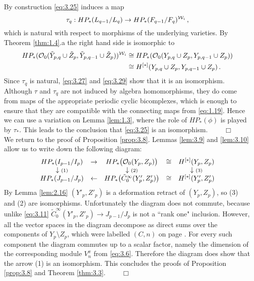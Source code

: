 By construction \eqref{eq:3.25} induces a map
\[
\tau_q : HP_* (L_{q-1}/L_q ) \to HP_* (F_{q-1}/F_q )^{\mathcal W_i} \,,
\]
which is natural with respect to morphisms of the underlying varieties.
By Theorem \ref{thm:1.4}.a the right hand side is isomorphic to
\begin{equation}\label{eq:3.29}
\begin{split} HP_* (\mathcal O_0 (\tilde Y_{p,q} \cup \tilde Z_p 
,\tilde Y_{p,q-1} \cup \tilde Z_p ) )^{\mathcal W_i} 
& \cong HP_* (\mathcal O_0 (Y_{p,q} \cup Z_p ,Y_{p,q-1} \cup Z_p )) \\
& \cong H^{[*]} (Y_{p,q} \cup Z_p ,Y_{p,q-1} \cup Z_p ) \,.
\end{split}
\end{equation}
Since $\tau_q$ is natural, \eqref{eq:3.27} and \eqref{eq:3.29} show that it is an isomorphism.
Although $\tau$ and $\tau_q$ are not induced by algebra homomorphisms, they do come from maps of
the appropriate periodic cyclic bicomplexes, which is enough to ensure that they are compatible
with the connecting maps from \eqref{eq:1.19}. Hence we can use a variation on Lemma \ref{lem:1.3}, 
where the role of $HP_* (\phi )$ is played by $\tau_*$.
This leads to the conclusion that \eqref{eq:3.25} is an isomorphism. $\qquad \Box$
\\[2mm]

We return to the proof of Proposition \ref{prop:3.8}.
Lemmas \ref{lem:3.9} and \ref{lem:3.10} allow us to write down the following diagram:
\[
\begin{array}{ccccc}
HP_* (I_{p-1}/I_p ) & \rightarrow & HP_* \big( \mathcal O_0 (Y_p ,Z_p ) \big) 
& \cong & H^{[*]} (Y_p , Z_p ) \\
\downarrow {\scriptstyle(1)} & & \downarrow {\scriptstyle(2)} & & \downarrow {\scriptstyle(3)} \\
HP_* (J_{p-1}/J_p ) & \leftarrow & HP_* \big( \tilde C_0^\infty (Y'_p , Z'_p ) \big) 
& \cong &H^{[*]} (Y'_p ,Z'_p ) 
\end{array}
\]
By Lemma \ref{lem:2.16} $(Y'_p ,Z'_p )$ is a deformation retract of $(Y_p ,Z_p )$, so (3) and (2)
are isomorphisms. Unfortunately the diagram does not commute, because unlike \eqref{eq:3.11} 
$\tilde C_0^\infty (Y'_p , Z'_p ) \to J_{p-1} / J_p$ is not a ``rank one" inclusion. However, 
all the vector spaces in the diagram decompose as direct sums over the components of 
$Y_p \setminus Z_p$, which were labelled $(C,n)$ on page \pageref{eq:3.3}. For every such 
component the diagram commutes up to a scalar factor, namely the dimension of the corresponding 
module $V^x_n$ from \eqref{eq:3.6}. Therefore the diagram does show that the arrow (1) is an 
isomorphism. This concludes the proofs of Proposition \ref{prop:3.8} and Theorem \ref{thm:3.3}.
$\qquad \Box$ \\[2mm]

